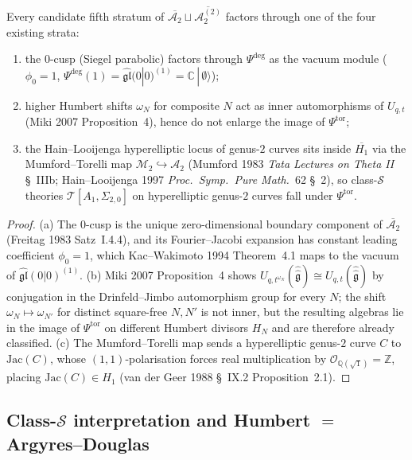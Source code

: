 \begin{lemma}
\label{lem:no-fifth-stratum}
Every candidate fifth stratum of
$\overline{\mathcal A_2}\sqcup\overline{\mathcal A_2^{(2)}}$
factors through one of the four existing strata:
\begin{enumerate}
\item[(a)] the $0$-cusp (Siegel parabolic) factors through
$\Psi^{\deg}$ as the vacuum module ($\phi_0 = 1$,
$\Psi^{\deg}(1) = \widehat{\mathfrak{gl}}(0|0)^{(1)}
= \mathbb C\,|\,\emptyset\rangle$);
\item[(b)] higher Humbert shifts $\omega_N$ for composite $N$
act as inner automorphisms of $U_{q,t}$ (Miki 2007
Proposition~4), hence do not enlarge the image of
$\Psi^{\mathrm{tor}}$;
\item[(c)] the Hain--Looijenga hyperelliptic locus of genus-$2$
curves sits inside $\overline{H_1}$ via the Mumford--Torelli
map $\mathcal M_2 \hookrightarrow \mathcal A_2$
(Mumford 1983 \textit{Tata Lectures on Theta II} \S~IIIb;
Hain--Looijenga 1997 \textit{Proc.~Symp.~Pure Math.}~62 \S~2),
so class-$\mathcal S$ theories
$\mathcal T[A_1, \Sigma_{2,0}]$ on hyperelliptic genus-$2$
curves fall under $\Psi^{\mathrm{tor}}$.
\end{enumerate}
\end{lemma}

\begin{proof}[Proof]
(a) The $0$-cusp is the unique zero-dimensional boundary
component of $\overline{\mathcal A_2}$ (Freitag 1983
Satz~I.4.4), and its Fourier--Jacobi expansion has constant
leading coefficient $\phi_0 = 1$, which Kac--Wakimoto 1994
Theorem~4.1 maps to the vacuum of
$\widehat{\mathfrak{gl}}(0|0)^{(1)}$.
(b) Miki 2007 Proposition~4 shows
$U_{q, t^{\omega_N}}(\widehat{\widehat{\mathfrak g}}) \cong
U_{q, t}(\widehat{\widehat{\mathfrak g}})$ by conjugation in
the Drinfeld--Jimbo automorphism group for every $N$; the
shift $\omega_N \mapsto \omega_{N'}$ for distinct square-free
$N, N'$ is not inner, but the resulting algebras lie in the
image of $\Psi^{\mathrm{tor}}$ on different Humbert divisors
$H_N$ and are therefore already classified.
(c) The Mumford--Torelli map sends a hyperelliptic genus-$2$
curve $C$ to $\mathrm{Jac}(C)$, whose $(1,1)$-polarisation
forces real multiplication by
$\mathcal O_{\mathbb Q(\sqrt 1)} = \mathbb Z$, placing
$\mathrm{Jac}(C) \in H_1$
(van der Geer 1988 \S~IX.2 Proposition~2.1).
\end{proof}

\subsection{Class-\texorpdfstring{$\mathcal S$}{S} interpretation and Humbert \texorpdfstring{$=$}{=}
Argyres--Douglas}
\label{subsec:humbert-argyres-douglas}

